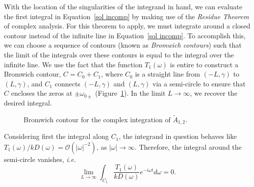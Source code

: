 \documentclass[12pt]{../style-files/ociamthesis}
\begin{document}
With the location of the singularities of the integrand in hand, we can evaluate the first integral in Equation~\eqref{sol incomp} by making use of the \textit{Residue Theorem} of complex analysis. For this theorem to apply, we must integrate around a closed contour instead of the infinite line in Equation~\eqref{sol incomp}. To accomplish this, we can choose a sequence of contours (known as \textit{Bromwich contours}) such that the limit of the integrals over these contours is equal to the integral over the infinite line. We use the fact that the function $T_1(\omega)$ is entire to construct a Bromwich contour, $C = C_0 + C_1$, where $C_0$ is a straight line from $(-L, \gamma)$ to $(L, \gamma)$, and $C_1$ connects $(-L, \gamma)$ and $(L, \gamma)$ via a semi-circle to ensure that $C$ encloses the zeros at $\pm\omega_{0\pm}$ (Figure~\ref{fig: brom cont incomp}). In the limit $L \to \infty$, we recover the desired integral.

\begin{figure}
	\centering
	\caption{Bromwich contour for the complex integration of $\tilde{A}_{1,2}$.}
	\label{fig: brom cont incomp}
\end{figure}
Considering first the integral along $C_1$, the integrand in question behaves like $T_1(\omega)/kD(\omega) = \mathcal{O}(|\omega|^{-2})$, as $|\omega| \to \infty$. Therefore, the integral around the semi-circle vanishes, \textit{i.e.}
\begin{equation}
\lim_{L \to \infty} \int_{C_1} \frac{T_1(\omega)}{kD(\omega)} e^{-i\omega t} d\omega = 0.
\end{equation}
\end{document}
